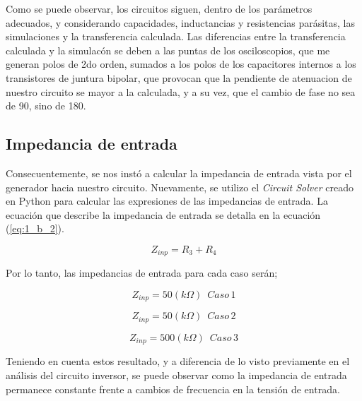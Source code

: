Como se puede observar, los circuitos siguen, dentro de los parámetros
adecuados, y considerando capacidades, inductancias y resistencias
parásitas, las simulaciones y la transferencia calculada. Las diferencias
entre la transferencia calculada y la simulacón se deben a las puntas
de los osciloscopios, que me generan polos de 2do orden, sumados a
los polos de los capacitores internos a los transistores de juntura
bipolar, que provocan que la pendiente de atenuacion de nuestro circuito
se mayor a la calculada, y a su vez, que el cambio de fase no sea
de 90\textdegree , sino de 180\textdegree .

\subsection{Impedancia de entrada}

Consecuentemente, se nos instó a calcular la impedancia de entrada
vista por el generador hacia nuestro circuito. Nuevamente, se utilizo
el \emph{Circuit Solver }creado en Python para calcular las expresiones
de las impedancias de entrada. La ecuación que describe la impedancia
de entrada se detalla en la ecuación (\ref{eq:1_b_2}).

\begin{equation}
Z_{inp}=R_{3}+R_{4}\label{eq:1_b_2}
\end{equation}

Por lo tanto, las impedancias de entrada para cada caso serán;

\[
Z_{inp}=50(k\Omega)\,\,\,Caso\,1
\]

\[
Z_{inp}=50(k\Omega)\,\,\,Caso\,2
\]

\[
Z_{inp}=500(k\Omega)\,\,\,Caso\,3
\]

Teniendo en cuenta estos resultado, y a diferencia de lo visto previamente
en el análisis del circuito inversor, se puede observar como la impedancia
de entrada permanece constante frente a cambios de frecuencia en la
tensión de entrada.

